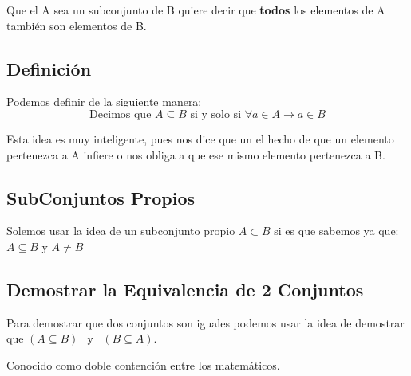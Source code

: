 \documentclass[12pt, fleqn]{report}                             %
\DeclareMathOperator \Space {\quad}                             %
\DeclareMathOperator \MiniSpace {\;}                            %
\newcommand \Also {\MiniSpace \text{y} \MiniSpace}              %
\begin{document}
            Que el A sea un subconjunto de B quiere decir que \textbf{todos} los elementos de A
            también son elementos de B.


            \subsection{Definición}

                Podemos definir de la siguiente manera:
                \begin{equation*}
                    \text{Decimos que }
                    A \subseteq B 
                    \text{ si y solo si }
                    \forall a \in A \to a \in B
                \end{equation*}

                Esta idea es muy inteligente, pues nos dice que un el hecho de que
                un elemento pertenezca a A infiere o nos obliga a que ese mismo
                elemento pertenezca a B.

            \subsection{SubConjuntos Propios}

                Solemos usar la idea de un subconjunto propio $A \subset B$ si es que sabemos ya que:
                $A \subseteq B$ y $A \neq B$


            \subsection{Demostrar la Equivalencia de 2 Conjuntos}

                Para demostrar que dos conjuntos son iguales podemos usar la idea de
                demostrar que $(A \subseteq B ) \Also (B \subseteq A)$.

                Conocido como doble contención entre los matemáticos.


            \clearpage
\end{document}
